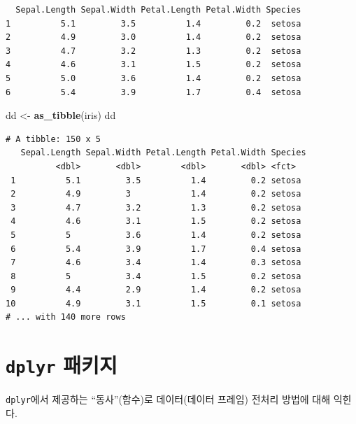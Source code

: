 \documentclass[
  11pt,
]{krantz}
\newenvironment{Shaded}{\begin{snugshade}}{\end{snugshade}}
\newcommand{\KeywordTok}[1]{\textcolor[rgb]{0.27,0.27,0.27}{\textbf{#1}}}
\newcommand{\NormalTok}[1]{#1}
\newcommand{\StringTok}[1]{\textcolor[rgb]{0.5,0.5,0.5}{#1}}
\let\BeginKnitrBlock\begin \let\EndKnitrBlock\end
\begin{document}
\begin{verbatim}
  Sepal.Length Sepal.Width Petal.Length Petal.Width Species
1          5.1         3.5          1.4         0.2  setosa
2          4.9         3.0          1.4         0.2  setosa
3          4.7         3.2          1.3         0.2  setosa
4          4.6         3.1          1.5         0.2  setosa
5          5.0         3.6          1.4         0.2  setosa
6          5.4         3.9          1.7         0.4  setosa
\end{verbatim}

\begin{Shaded}
\begin{Highlighting}[]
\NormalTok{dd <-}\StringTok{ }\KeywordTok{as_tibble}\NormalTok{(iris)}
\NormalTok{dd}
\end{Highlighting}
\end{Shaded}

\begin{verbatim}
# A tibble: 150 x 5
   Sepal.Length Sepal.Width Petal.Length Petal.Width Species
          <dbl>       <dbl>        <dbl>       <dbl> <fct>  
 1          5.1         3.5          1.4         0.2 setosa 
 2          4.9         3            1.4         0.2 setosa 
 3          4.7         3.2          1.3         0.2 setosa 
 4          4.6         3.1          1.5         0.2 setosa 
 5          5           3.6          1.4         0.2 setosa 
 6          5.4         3.9          1.7         0.4 setosa 
 7          4.6         3.4          1.4         0.3 setosa 
 8          5           3.4          1.5         0.2 setosa 
 9          4.4         2.9          1.4         0.2 setosa 
10          4.9         3.1          1.5         0.1 setosa 
# ... with 140 more rows
\end{verbatim}

\normalsize

\hypertarget{dplyr}{%
\section{\texorpdfstring{\texttt{dplyr} 패키지}{dplyr 패키지}}\label{dplyr}}

\footnotesize

\BeginKnitrBlock{rmdnote}
\texttt{dplyr}에서 제공하는 ``동사''(함수)로 데이터(데이터 프레임) 전처리 방법에 대해 익힌다.
\EndKnitrBlock{rmdnote}

\normalsize
\end{document}
